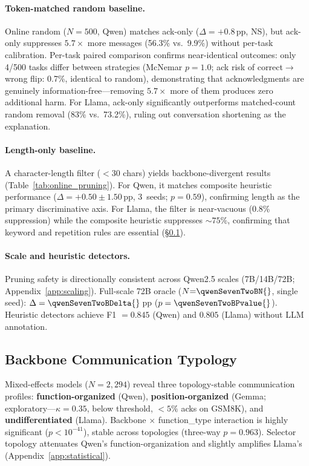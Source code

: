 \paragraph{Token-matched random baseline.} Online random ($N{=}500$, Qwen) matches ack-only ($\Delta = +0.8$\,pp, NS), but ack-only suppresses $5.7\times$ more messages (56.3\% vs.\ 9.9\%) without per-task calibration. Per-task paired comparison confirms near-identical outcomes: only 4/500 tasks differ between strategies (McNemar $p = 1.0$; ack risk of correct$\to$wrong flip: 0.7\%, identical to random), demonstrating that acknowledgments are genuinely information-free---removing $5.7\times$ more of them produces zero additional harm. For Llama, ack-only significantly outperforms matched-count random removal (83\% vs.\ 73.2\%), ruling out conversation shortening as the explanation.

\paragraph{Length-only baseline.} A character-length filter ($< 30$ chars) yields backbone-divergent results (Table~\ref{tab:online_pruning}). For Qwen, it matches composite heuristic performance ($\Delta = +0.50 \pm 1.50$\,pp, 3~seeds; $p = 0.59$), confirming length as the primary discriminative axis. For Llama, the filter is near-vacuous (0.8\% suppression) while the composite heuristic suppresses ${\sim}75\%$, confirming that keyword and repetition rules are essential (\S\ref{sec:three_modes}).

\paragraph{Scale and heuristic detectors.} Pruning safety is directionally consistent across Qwen2.5 scales (7B/14B/72B; Appendix~\ref{app:scaling}). Full-scale 72B oracle ($N{=}\qwenSevenTwoBN{}$, single seed): $\Delta = \qwenSevenTwoBDelta{}$\,pp ($p = \qwenSevenTwoBPvalue{}$). Heuristic detectors achieve F1 $= 0.845$ (Qwen) and $0.805$ (Llama) without LLM annotation.

\subsection{Backbone Communication Typology}
\label{sec:three_modes}

Mixed-effects models ($N = 2{,}294$) reveal three topology-stable communication profiles: \textbf{function-organized} (Qwen), \textbf{position-organized} (Gemma; exploratory---$\kappa = 0.35$, below threshold, $< 5\%$ acks on GSM8K), and \textbf{undifferentiated} (Llama). Backbone $\times$ function\_type interaction is highly significant ($p < 10^{-41}$), stable across topologies (three-way $p = 0.963$). Selector topology attenuates Qwen's function-organization and slightly amplifies Llama's (Appendix~\ref{app:statistical}).

